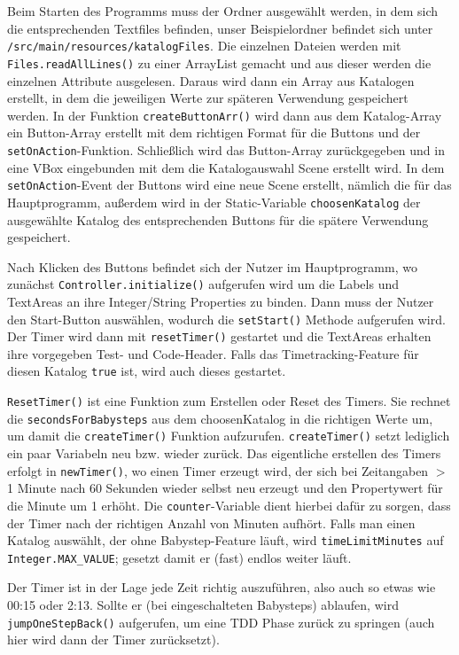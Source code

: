 \documentclass[10pt]{article}
\begin{document}
Beim Starten des Programms muss der Ordner ausgewählt werden, in dem sich die entsprechenden Textfiles befinden, unser Beispielordner befindet sich unter \verb+/src/main/resources/katalogFiles+. Die einzelnen Dateien werden mit \linebreak \verb+Files.readAllLines()+ zu einer ArrayList gemacht und aus dieser werden die einzelnen Attribute ausgelesen. Daraus wird dann ein Array aus Katalogen erstellt, in dem die jeweiligen Werte zur späteren Verwendung gespeichert werden. In der Funktion \verb+createButtonArr()+ wird dann aus dem Katalog-Array ein Button-Array erstellt mit dem richtigen Format für die Buttons und der \verb+setOnAction+-Funktion. Schließlich wird das Button-Array zurückgegeben und in eine VBox eingebunden mit dem die Katalogauswahl Scene erstellt wird. In dem \verb+setOnAction+-Event der Buttons wird eine neue Scene erstellt, nämlich die für das Hauptprogramm, außerdem wird in der Static-Variable \verb+choosenKatalog+ der ausgewählte Katalog des entsprechenden Buttons für die spätere Verwendung gespeichert.

Nach Klicken des Buttons befindet sich der Nutzer im Hauptprogramm, wo zunächst \verb+Controller.initialize()+  aufgerufen wird um die Labels und TextAreas an ihre Integer/String Properties zu binden. Dann muss der Nutzer den Start-Button auswählen, wodurch die \verb+setStart()+ Methode aufgerufen wird. Der Timer wird dann mit \verb+resetTimer()+ gestartet und die TextAreas erhalten ihre vorgegeben Test- und Code-Header. Falls das Timetracking-Feature für diesen Katalog \verb+true+ ist, wird auch dieses gestartet.

\verb+ResetTimer()+ ist eine Funktion zum Erstellen oder Reset des Timers. Sie rechnet die \verb+secondsForBabysteps+ aus dem choosenKatalog in die richtigen Werte um, um damit die \verb+createTimer()+ Funktion aufzurufen. \verb+createTimer()+ setzt lediglich ein paar Variabeln neu bzw. wieder zurück. Das eigentliche erstellen des Timers erfolgt in \verb+newTimer()+, wo einen Timer erzeugt wird, der sich bei Zeitangaben $>$ 1 Minute nach 60 Sekunden wieder selbst neu erzeugt und den Propertywert für die Minute um 1 erhöht. Die \verb+counter+-Variable dient hierbei dafür zu sorgen, dass der Timer nach der richtigen Anzahl von Minuten aufhört. 
Falls man einen Katalog auswählt, der ohne Babystep-Feature läuft, wird \verb+timeLimitMinutes+ auf \verb+Integer.MAX_VALUE+; gesetzt damit er (fast) endlos weiter läuft.

Der Timer ist in der Lage jede Zeit richtig auszuführen, also auch so etwas wie 00:15 oder 2:13.
Sollte er (bei eingeschalteten Babysteps) ablaufen, wird \verb+jumpOneStepBack()+ aufgerufen, um eine TDD Phase zurück zu springen (auch hier wird dann der Timer zurücksetzt).
\end{document}
